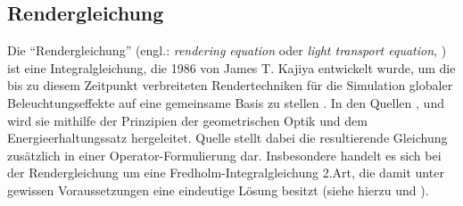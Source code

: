 
	\subsection{Rendergleichung} %
	\label{sub:rendergleichung}

		Die \enquote{Rendergleichung} (engl.: \textit{rendering equation} oder \textit{light transport equation}, \cite[S.~861]{pbrt3}) ist eine Integralgleichung, die 1986 von James T. Kajiya entwickelt wurde, um die bis zu diesem Zeitpunkt verbreiteten Rendertechniken für die Simulation globaler Beleuchtungseffekte auf eine gemeinsame Basis zu stellen \cite{kajiya-lte}.
		In den Quellen \cite{kajiya-lte}, \cite[S.~349~ff,~862~ff]{pbrt3} und \cite{veach-thesis} wird sie mithilfe der Prinzipien der geometrischen Optik und dem Energieerhaltungssatz hergeleitet.
		Quelle \cite{veach-thesis} stellt dabei die resultierende Gleichung zusätzlich in einer Operator-Formulierung dar.
		Insbesondere handelt es sich bei der Rendergleichung um eine Fredholm-Integralgleichung 2.Art, die damit unter gewissen Voraussetzungen eine eindeutige Lösung besitzt (siehe hierzu \cite[S.~103~ff]{veach-thesis} und \cite{integral-equations}).

